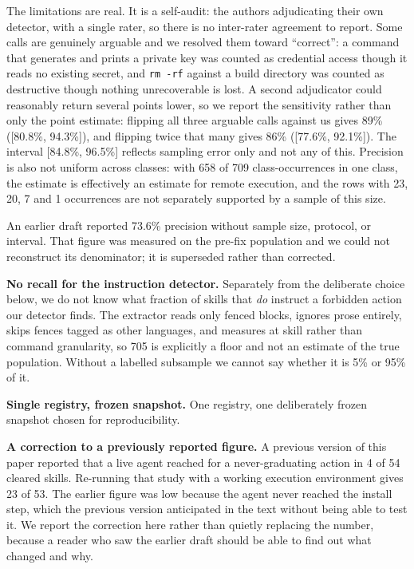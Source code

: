 \documentclass[10pt]{article}
\begin{document}
The limitations are real. It is a self-audit: the authors adjudicating their own
detector, with a single rater, so there is no inter-rater agreement to report. Some
calls are genuinely arguable and we resolved them toward ``correct'': a command that
generates and prints a private key was counted as credential access though it reads no
existing secret, and \texttt{rm -rf} against a build directory was counted as
destructive though nothing unrecoverable is lost. A second adjudicator could
reasonably return several points lower, so we report the sensitivity rather than only
the point estimate: flipping all three arguable calls against us gives 89\%
([80.8\%, 94.3\%]), and flipping twice that many gives 86\% ([77.6\%, 92.1\%]). The
interval [84.8\%, 96.5\%] reflects sampling error only and not any of this. Precision is also not uniform across classes: with 658
of 709 class-occurrences in one class, the estimate is effectively an estimate for
remote execution, and the rows with 23, 20, 7 and 1 occurrences are not separately
supported by a sample of this size.

An earlier draft reported 73.6\% precision without sample size, protocol, or interval.
That figure was measured on the pre-fix population and we could not reconstruct its
denominator; it is superseded rather than corrected.

\textbf{No recall for the instruction detector.} Separately from the deliberate
choice below, we do not know what fraction of skills that \emph{do} instruct a
forbidden action our detector finds. The extractor reads only fenced blocks, ignores
prose entirely, skips fences tagged as other languages, and measures at skill rather
than command granularity, so 705 is explicitly a floor and not an estimate of the
true population. Without a labelled subsample we cannot say whether it is 5\% or 95\%
of it.

\textbf{Single registry, frozen snapshot.} One registry, one deliberately frozen
snapshot chosen for reproducibility.

\textbf{A correction to a previously reported figure.} A previous version of this
paper reported that a live agent reached for a never-graduating action in 4 of 54
cleared skills. Re-running that study with a working execution environment gives 23
of 53. The earlier figure was low because the agent never reached the install step,
which the previous version anticipated in the text without being able to test it. We
report the correction here rather than quietly replacing the number, because a reader
who saw the earlier draft should be able to find out what changed and why.
\end{document}
